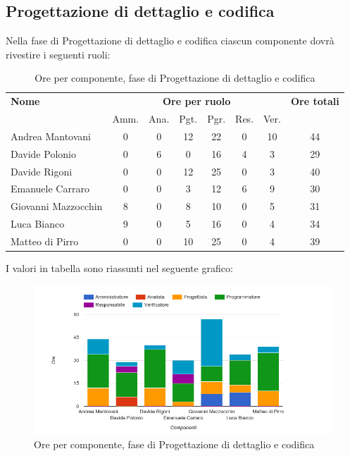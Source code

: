     
    
    
\pagebreak
\subsection{Progettazione di dettaglio e codifica}
Nella fase di Progettazione di dettaglio e codifica ciascun componente dovrà rivestire i seguenti ruoli:

\begin{table}[H]
\begin{tabular}{lccccccc}
\toprule
    \textbf{Nome}  & \multicolumn{6}{c}{\textbf{Ore per ruolo}} & \textbf{Ore totali} \\
     & Amm. & Ana. & Pgt. & Pgr. & Res. & Ver. & \\
    \midrule
    
	   Andrea Mantovani & 0 & 0 & 12 & 22 & 0 & 10 & 44 \\
         Davide Polonio & 0 & 6 & 0 & 16 & 4 & 3 & 29 \\
       	  Davide Rigoni & 0 & 0 & 12 & 25 & 0 & 3 & 40 \\
	   Emanuele Carraro & 0 & 0 & 3 & 12 & 6 & 9 & 30 \\
	Giovanni Mazzocchin & 8 & 0 & 8 & 10 & 0 & 5 & 31 \\
	        Luca Bianco & 9 & 0 & 5 & 16 & 0 & 4 & 34 \\
      	Matteo di Pirro & 0 & 0 & 10 & 25 & 0 & 4 & 39 \\
    
    
    \bottomrule
\end{tabular}
\caption{Ore per componente, fase di Progettazione di dettaglio e codifica}
\end{table}

I valori in tabella sono riassunti nel seguente grafico: \\ 

    \begin{figure}[H]
      \begin{center}
        \includegraphics[width=12cm]{res/img/orePerComponenteProgettazioneDettaglioCodifica.png}
      \caption{Ore per componente, fase di Progettazione di dettaglio e codifica}
      \end{center} 
    \end{figure}    
    
